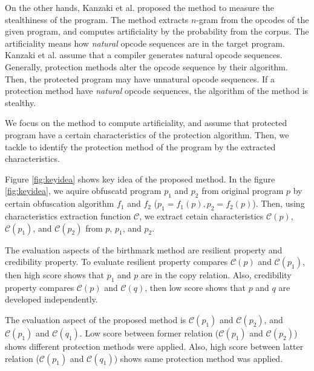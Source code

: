\documentclass[conference]{IEEEtran}
\newcommand{\birth}[1]{\mathcal{C}(#1)}
\begin{document}
On the other hands, Kanzaki et al. proposed the method to measure the
stealthiness of the program\cite{kanzaki14ipsj}. The method extracts
$n$-gram from the opcodes of the given program, and computes
artificiality by the probability from the corpus.  The artificiality
means how {\em natural} opcode sequences are in the target program.
Kanzaki et al. assume that a compiler generates natural opcode
sequences.  Generally, protection methods alter the opcode sequence by
their algorithm.  Then, the protected program may have unnatural
opcode sequences.  If a protection method have {\em natural} opcode
sequences, the algorithm of the method is stealthy.

We focus on the method to compute artificiality, and assume that
protected program have a certain characteristics of the protection
algorithm.  Then, we tackle to identify the protection method of the
program by the extracted characteristics.

Figure \ref{fig:keyidea} shows key idea of the proposed method.  In
the figure \ref{fig:keyidea}, we aquire obfuscatd program $p_1$ and
$p_2$ from original program $p$ by certain obfuscation algorithm $f_1$
and $f_2$ ($p_1 = f_1(p), p_2 = f_2(p)$).  Then, using characteristics
extraction function $\mathcal{C}$, we extract cetain characteristics
$\birth{p}$, $\birth{p_1}$, and $\birth{p_2}$ from $p$, $p_1$, and
$p_2$.

The evaluation aspects of the birthmark method are resilient property
and credibility property.  To evaluate resilient property compares
$\birth{p}$ and $\birth{p_1}$, then high score shows that $p_1$ and
$p$ are in the copy relation.  Also, credibility property compares
$\birth{p}$ and $\birth{q}$, then low score shows that $p$ and $q$ are
developed independently.

The evaluation aspect of the proposed method is $\birth{p_1}$ and
$\birth{p_2}$, and $\birth{p_1}$ and $\birth{q_1}$.  Low score between
former relation ($\birth{p_1}$ and $\birth{p_2}$) shows different
protection methods were applied.  Also, high score between latter
relation ($\birth{p_1}$ and $\birth{q_1}$) shows same protection
method was applied.
\end{document}
